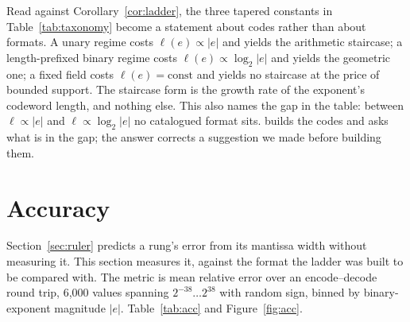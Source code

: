 Read against Corollary~\ref{cor:ladder}, the three tapered constants in
Table~\ref{tab:taxonomy} become a statement about codes rather than about
formats. A unary regime costs $\ell(e) \propto |e|$ and yields the arithmetic
staircase; a length-prefixed binary regime costs $\ell(e) \propto \log_2 |e|$ and
yields the geometric one; a fixed field costs $\ell(e) = \mathrm{const}$ and
yields no staircase at the price of bounded support. The staircase form is the
growth rate of the exponent's codeword length, and nothing else. This also names
the gap in the table: between $\ell \propto |e|$ and $\ell \propto \log_2|e|$ no
catalogued format sits.  builds the codes and asks what is
in the gap; the answer corrects a suggestion we made before building them.



\section{Accuracy}\label{sec:accuracy}



Section~\ref{sec:ruler} predicts a rung's error from its mantissa width without
measuring it. This section measures it, against the format the ladder was built
to be compared with. The metric is mean relative error over an encode--decode
round trip, 6{,}000 values spanning
$2^{-38}\ldots2^{38}$ with random sign, binned by binary-exponent magnitude
$|e|$. Table~\ref{tab:acc} and Figure~\ref{fig:acc}.

